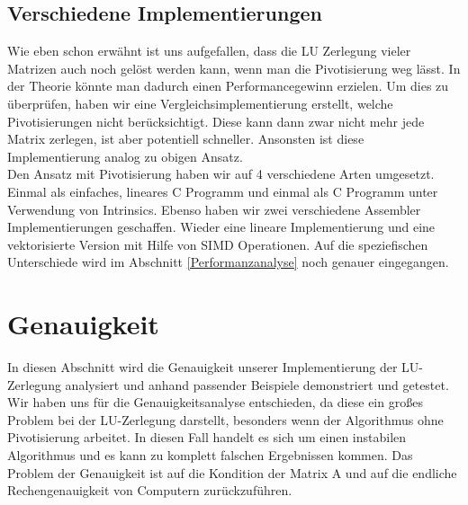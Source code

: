 \documentclass[course=erap]{aspdoc}
\begin{document}
\subsection{Verschiedene Implementierungen}
Wie eben schon erwähnt ist uns aufgefallen, dass die LU Zerlegung vieler Matrizen auch noch gelöst werden kann, wenn man 
die Pivotisierung weg lässt. In der Theorie könnte man dadurch einen Performancegewinn erzielen. Um dies zu überprüfen, 
haben wir eine Vergleichsimplementierung erstellt, welche Pivotisierungen nicht berücksichtigt. Diese kann dann zwar nicht 
mehr jede Matrix zerlegen, ist aber potentiell schneller. Ansonsten ist diese Implementierung analog zu obigen Ansatz.\\ 
Den Ansatz mit Pivotisierung haben wir auf 4 verschiedene Arten umgesetzt. Einmal als einfaches, lineares C Programm 
und einmal als C Programm unter Verwendung von Intrinsics. Ebenso haben wir zwei verschiedene Assembler Implementierungen 
geschaffen. Wieder eine lineare Implementierung und eine vektorisierte Version mit Hilfe von SIMD Operationen.
Auf die speziefischen Unterschiede wird im Abschnitt \ref{Performanzanalyse} noch genauer eingegangen.




\section{Genauigkeit}
In diesen Abschnitt wird die Genauigkeit unserer Implementierung der LU-Zerlegung analysiert und anhand 
passender Beispiele demonstriert und getestet. Wir haben uns für die 
Genauigkeitsanalyse entschieden, da diese ein großes Problem bei der LU-Zerlegung 
darstellt, besonders wenn der Algorithmus ohne Pivotisierung arbeitet. In diesen Fall 
handelt es sich um einen instabilen Algorithmus und es kann zu komplett 
falschen Ergebnissen kommen. Das Problem der Genauigkeit ist auf die Kondition der 
Matrix A und auf die endliche Rechengenauigkeit von Computern zurückzuführen. \\
\end{document}
